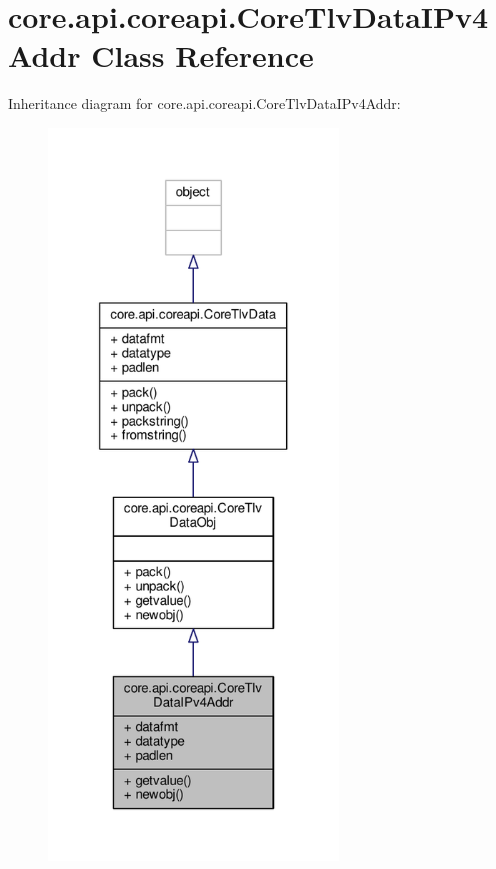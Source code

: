 \hypertarget{classcore_1_1api_1_1coreapi_1_1_core_tlv_data_i_pv4_addr}{\section{core.\+api.\+coreapi.\+Core\+Tlv\+Data\+I\+Pv4\+Addr Class Reference}
\label{classcore_1_1api_1_1coreapi_1_1_core_tlv_data_i_pv4_addr}
}


Inheritance diagram for core.\+api.\+coreapi.\+Core\+Tlv\+Data\+I\+Pv4\+Addr\+:
\nopagebreak
\begin{figure}[H]
\begin{center}
\leavevmode
\includegraphics[height=550pt]{classcore_1_1api_1_1coreapi_1_1_core_tlv_data_i_pv4_addr__inherit__graph}
\end{center}
\end{figure}


